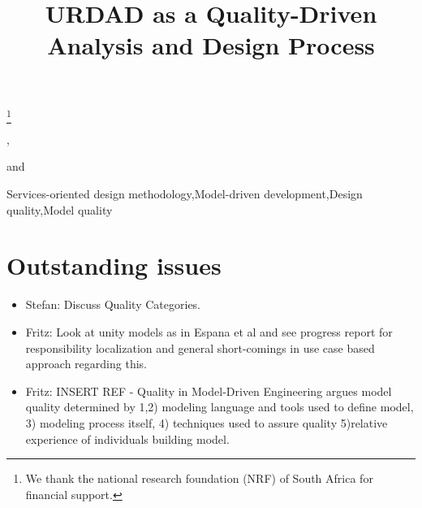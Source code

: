 \documentclass{IOS-Book-Article}
\begin{document}
\begin{frontmatter} 

\title{URDAD as a Quality-Driven Analysis and Design Process}
\thanks{We thank the national research foundation (NRF) of South Africa for financial support.}

\author[A]{ }
,
\author[A]{ }
and
\author[A]{ }

\address[A]{Department of Computer Science, University of Pretoria, South Africa}


\begin{keyword}
Services-oriented design methodology\sep Model-driven development\sep Design quality\sep Model quality
\end{keyword}
\end{frontmatter}

\thispagestyle{empty}
\pagestyle{empty}

\maketitle

\listoftodos

\section{Outstanding issues}
\begin{itemize}
 \item Stefan: Discuss Quality Categories. 
 \item Fritz: Look at unity models as in Espana et al and see progress report for responsibility localization and general short-comings in use case based approach regarding this. 
 \item Fritz: INSERT REF - Quality in Model-Driven Engineering argues model quality determined by 1,2) modeling language and tools used to define model, 3) modeling process itself, 4) techniques used to assure quality 5)relative experience of individuals building model. 
\end{itemize}
















\end{document}
